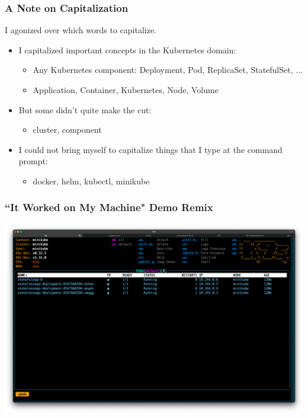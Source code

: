     \begin{frame}
        \frametitle{A Note on Capitalization}
        I agonized over which words to capitalize.
        \begin{itemize}
            \item{I capitalized important concepts in the Kubernetes domain:}
            \begin{itemize}
                \item{Any Kubernetes component: Deployment, Pod, ReplicaSet, StatefulSet, ...}
                \item{Application, Container, Kubernetes, Node, Volume}
            \end{itemize}

            \item{But some didn't quite make the cut:}
            \begin{itemize}
                \item{cluster, component}
            \end{itemize}

            \item{I could not bring myself to capitalize things that I type at the command prompt:}
            \begin{itemize}
                \item{docker, helm, kubectl, minikube}
            \end{itemize}
        \end{itemize}
    \end{frame}

    \begin{frame}
        \frametitle{``It Worked on My Machine" Demo Remix}
        \includegraphics[width=\textwidth,height=0.85\textheight,keepaspectratio]{graphics/screenshots/00-pods}
    \end{frame}

